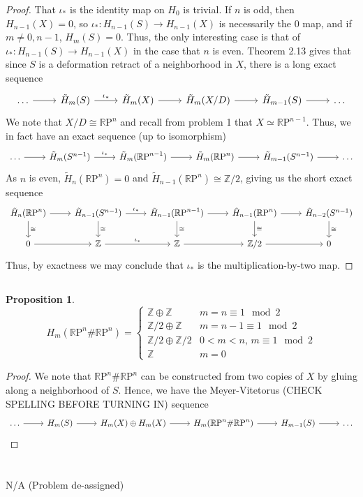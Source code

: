 \documentclass[english]{article}
\newcommand{\RR}{\mathbb{R}}
\newcommand{\ZZ}{\mathbb{Z}}
\newcommand{\prob}[1]{\setcounter{section}{#1-1}\section{}}
\newcommand{\prt}[1]{\setcounter{subsection}{#1-1}\subsection{}}
\newtheorem*{proposition*}{Proposition}
\theoremstyle{remark}
\theoremstyle{definition}
\newcommand{\tH}{\tilde{H}}
\newcommand{\RP}{{\RR\mathrm{P}}}
\newcommand{\csm}{\RP^n\#\RP^n}
\begin{document}
\begin{proof}
	That $\iota_*$ is the identity map on $H_0$ is trivial. If $n$ is odd, then $H_{n-1}(X)=0$, so $\iota_*:H_{n-1}(S)\to H_{n-1}(X)$ is necessarily the 0 map, and if $m\neq 0,n-1$, $H_m(S)=0$. Thus, the only interesting case is that of $\iota_*:H_{n-1}(S)\to H_{n-1}(X)$ in the case that $n$ is even.
	Theorem 2.13 gives that since $S$ is a deformation retract of a neighborhood in $X$, there is a long exact sequence $$\begin{tikzcd}
	\ldots \arrow[r]&\tH_m(S)\arrow[r,"\iota_*"]&\tH_m(X)\arrow[r]&\tH_m(X/D)\arrow[r]&\tH_{m-1}(S)\arrow[r]&\ldots
	\end{tikzcd}$$
	We note that $X/D\cong \RP^n$ and recall from problem 1 that $X\simeq \RP^{n-1}$. Thus, we in fact have an exact sequence (up to isomorphism)
	$$\begin{tikzcd}
	\ldots \arrow[r]&\tH_m(S^{n-1})\arrow[r,"\iota_*"]&\tH_m(\RP^{n-1})\arrow[r]&\tH_m(\RP^n)\arrow[r]&\tH_{m-1}(S^{n-1})\arrow[r]&\ldots
	\end{tikzcd}$$
	As $n$ is even, $\tH_n(\RP^n)=0$ and $\tH_{n-1}(\RP^n)\cong\ZZ/2$, giving us the short exact sequence
		$$\begin{tikzcd}
\tH_n(\RP^n)\arrow[r]\arrow[d,"\cong"]&\tH_{n-1}(S^{n-1})\arrow[d,"\cong"]\arrow[r,"\iota_*"]&\tH_{n-1}(\RP^{n-1})\arrow[r]\arrow[d,"\cong"]&\tH_{n-1}(\RP^{n})\arrow[r]\arrow[d,"\cong"]&\tH_{n-2}(S^{n-1})\arrow[d,"\cong"]\\
0\arrow[r]&\ZZ\arrow[r,"\iota_*"]&\ZZ\arrow[r]&\ZZ/2\arrow[r]&0
	\end{tikzcd}$$
	Thus, by exactness we may conclude that $\iota_*$ is the multiplication-by-two map.
\end{proof}
\prt{3}\begin{proposition*}
	\begin{equation}
		H_m(\RP^{n}\#\RP^n)=\begin{cases}
		\ZZ\oplus \ZZ& m=n\equiv 1\mod 2\\
		\ZZ/2\oplus \ZZ & m=n-1\equiv 1 \mod 2\\
		\ZZ/2 \oplus \ZZ/2 &0<m<n,\, m\equiv 1 \mod 2\\
		\ZZ& m=0
		\end{cases}
	\end{equation}
\end{proposition*}
\begin{proof}
 We note that $\RP^n\#\RP^n$ can be constructed from two copies of $X$ by gluing along a neighborhood of $S$. Hence, we have the Meyer-Vitetorus (CHECK SPELLING BEFORE TURNING IN) sequence
$$\begin{tikzcd}
\ldots \arrow[r]&H_m(S)\arrow[r]& H_m(X)\oplus H_m(X)\arrow[r]& H_m(\csm)\arrow[r] &H_{m-1} (S)\arrow[r]&\ldots
\end{tikzcd}$$

\end{proof}
\prob{2}
\prt{1}
\prt{2}
\prob{3}N/A (Problem de-assigned)

\prob{4}
\prt{1}
\prt{2}
\end{document}
